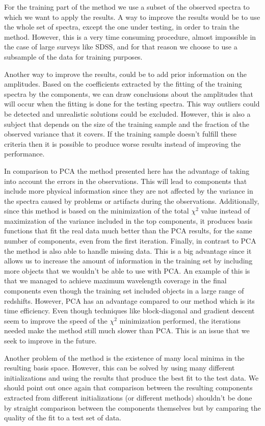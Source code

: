 \documentclass[12pt,preprint]{aastex}
\begin{document}
For the training part of the method we use a subset of the observed
spectra to which we want to apply the results. A way to improve the
results would be to use the whole set of spectra, except the one under
testing, in order to train the method. However, this is a very time
consuming procedure, almost impossible in the case of large surveys
like SDSS, and for that reason we choose to use a subsample of the
data for training purposes.

Another way to improve the results, could be to add prior information
on the amplitudes. Based on the coefficients extracted by the fitting
of the training spectra by the components, we can draw conclusions
about the amplitudes that will occur when the fitting is done for the
testing spectra. This way outliers could be detected and unrealistic
solutions could be excluded. However, this is also a subject that
depends on the size of the training sample and the fraction of the
observed variance that it covers. If the training sample doesn't
fulfill these criteria then it is possible to produce worse results
instead of improving the performance.

In comparison to PCA the method presented here has the advantage of
taking into account the errors in the observations. This will lead to
components that include more physical information since they are not
affected by the variance in the spectra caused by problems or
artifacts during the observations. Additionally, since this method is
based on the minimization of the total $\chi^2$ value instead of
maximization of the variance included in the top components, it
produces basis functions that fit the real data much better than the
PCA results, for the same number of components, even from the first
iteration. Finally, in contrast to PCA the method is also able to
handle missing data. This is a big advantage since it allows us to
increase the amount of information in the training set by including
more objects that we wouldn't be able to use with PCA. An example of
this is that we managed to achieve maximum wavelength coverage in the
final components even though the training set included objects in a
large range of redshifts. However, PCA has an advantage compared to
our method which is its time efficiency. Even though techniques like
block-diagonal and gradient descent seem to improve the speed of the
$\chi^2$ minimization performed, the iterations needed make the method
still much slower than PCA. This is an issue that we seek to improve
in the future.

Another problem of the method is the existence of many local minima in
the resulting basis space. However, this can be solved by using many
different initializations and using the results that produce the best
fit to the test data. We should point out once again that comparison
between the resulting components extracted from different
initializations (or different methods) shouldn't be done by straight
comparison between the components themselves but by camparing the
quality of the fit to a test set of data.
\end{document}
